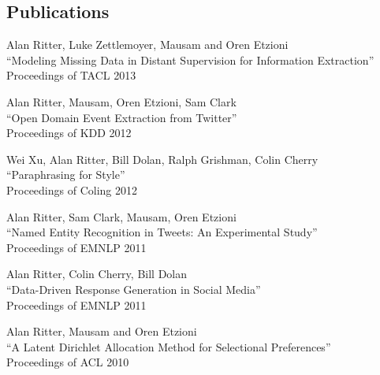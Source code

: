 \documentclass[margin,line]{res}
\begin{document}
\begin{resume}
\begin{comment}
Program Committee \emph{Workshop on Analyzing Microtext 2011}
\vspace*{-2.5mm}

Program Committee \emph{Workshop on Relational Models of Semantics 2011}
\vspace*{-2.5mm}

Program Committee \emph{Workshop on Information Extraction and Knowledge Acquisition 2011}
\vspace*{-2.5mm}

Program Committee \emph{EMNLP 2010}
\vspace*{-2.5mm}

Reviewer \emph{AAAI 2010}
\vspace*{-2.5mm}

Reviewer \emph{UIST 2009}
\vspace*{-2.5mm}

Prospective Graduate Student Committee, \emph{University of Washington} 2010
\end{comment}

\section{\sc Publications}


Alan Ritter, Luke Zettlemoyer, Mausam and Oren Etzioni \\
``Modeling Missing Data in Distant Supervision for Information Extraction''\\
Proceedings of TACL 2013

Alan Ritter, Mausam, Oren Etzioni, Sam Clark \\
``Open Domain Event Extraction from Twitter''\\
Proceedings of KDD 2012

Wei Xu, Alan Ritter, Bill Dolan, Ralph Grishman, Colin Cherry \\
``Paraphrasing for Style''\\
Proceedings of Coling 2012

Alan Ritter, Sam Clark, Mausam, Oren Etzioni \\
``Named Entity Recognition in Tweets: An Experimental Study''\\
Proceedings of EMNLP 2011

Alan Ritter, Colin Cherry, Bill Dolan \\
``Data-Driven Response Generation in Social Media'' \\
Proceedings of EMNLP 2011

Alan Ritter, Mausam and Oren Etzioni \\
``A Latent Dirichlet Allocation Method for Selectional Preferences'' \\
Proceedings of ACL 2010


\end{resume}
\end{document}
